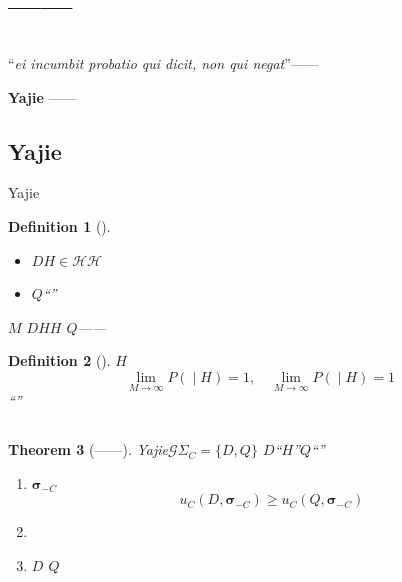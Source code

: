 \documentclass[11pt,a4paper]{article}
\newtheorem{theorem}{Theorem}[section]
\newtheorem{definition}[theorem]{Definition}
\theoremstyle{remark}
\begin{document}
\section{\\
         \large ——}

\subsection{}

``\textit{ei incumbit probatio qui dicit, non qui negat}''——
\textbf{}





\textbf{}\textbf{}


\textbf{Yajie}
——

\subsection{Yajie}

Yajie

\begin{definition}[]
\label{def:declaration_subgame}
\textbf{}
\begin{itemize}
    \item $D$$H \in \mathcal{H}$$\mathcal{H}$
          
    \item $Q$``''
\end{itemize}

\textbf{}$M$
$D$$H$$H$
$Q$——
\end{definition}

\begin{definition}[]
\label{def:verifiability}
$H$\textbf{}
\begin{equation}
    \lim_{M \to \infty} P(\text{} \mid H \text{}) = 1,
    \quad
    \lim_{M \to \infty} P(\text{} \mid H \text{}) = 1
\end{equation}
``''
\end{definition}

\subsection{}

\begin{theorem}[——]
\label{thm:honest_declarer}
Yajie$\mathcal{G}$$\Sigma_C = \{D, Q\}$
$D$``$H$''$Q$``''

\begin{enumerate}[label=(\roman*)]
    \item \textbf{}$\bm{\sigma}_{-C}$
          \begin{equation}
              u_C(D, \bm{\sigma}_{-C}) \geq u_C(Q, \bm{\sigma}_{-C})
          \end{equation}
    \item 
    \item $D$ \textbf{} $Q$
\end{enumerate}
\end{theorem}
\end{document}
